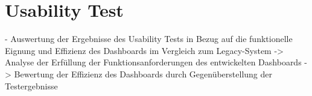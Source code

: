 \section{Usability Test}
- Auswertung der Ergebnisse des Usability Tests in Bezug auf die funktionelle Eignung und Effizienz des Dashboards im Vergleich zum Legacy-System
-> Analyse der Erfüllung der Funktionsanforderungen des entwickelten Dashboards
-> Bewertung der Effizienz des Dashboards durch Gegenüberstellung der Testergebnisse

